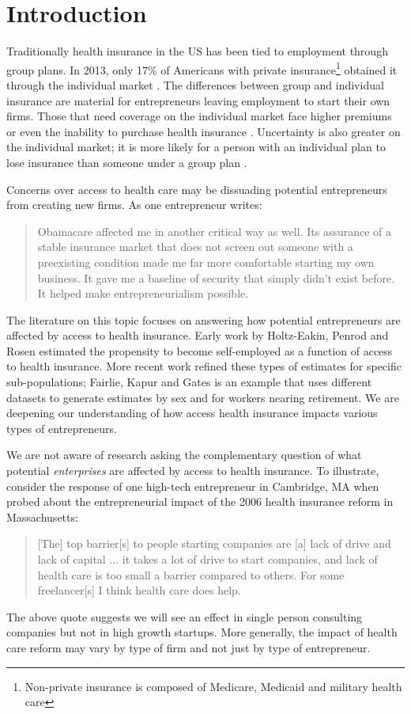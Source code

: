 
\chapter{Introduction}
Traditionally health insurance in the US has been tied to employment through group plans. In 2013, only 17\% of Americans with private insurance\footnote{Non-private insurance is composed of Medicare, Medicaid and military health care} obtained it through the individual market \cite{census}. The differences between group and individual insurance are material for entrepreneurs leaving employment to start their own firms. Those that need coverage on the individual market face higher premiums or even the inability to purchase health insurance \cite{kaiser}. Uncertainty is also greater on the individual market; it is more likely for a person with an individual plan to lose insurance than someone under a group plan \cite{pauly}. 

Concerns over access to health care may be dissuading potential entrepreneurs from creating new firms. As one entrepreneur writes:
\begin{quote}
Obamacare affected me in another critical way as well. Its assurance of a stable insurance market that does not screen out someone with a preexisting condition made me far more comfortable starting my own business. It gave me a baseline of security that simply didn't exist before. It helped make entrepreneurialism possible. \cite{sullivan}
\end{quote}

The literature on this topic focuses on answering how potential entrepreneurs are affected by access to health insurance. Early work by Holtz-Eakin, Penrod and Rosen \cite{holtz_health}  estimated the propensity to become self-employed as a function of access to health insurance. More recent work refined these types of estimates for specific sub-populations; Fairlie, Kapur and Gates \cite{fairlie_health} is an example that uses different datasets to generate estimates by sex and for workers nearing retirement. We are deepening our understanding of how access health insurance impacts various types of entrepreneurs. 

We are not aware of research asking the complementary question of what potential \emph{enterprises} are affected by access to health insurance. To illustrate, consider the response of one high-tech entrepreneur in Cambridge, MA when probed about the entrepreneurial impact of the 2006 health insurance reform in Massachusetts:
\begin{quote}
[The] top barrier[s] to people starting companies are [a] lack of drive and lack of capital ... it takes a lot of drive to start companies, and lack of health care is too small a barrier compared to others. For some freelancer[s] I think health care does help.
\end{quote}
The above quote suggests we will see an effect in single person consulting companies but not in high growth startups. More generally, the impact of health care reform may vary by type of firm and not just by type of entrepreneur. 

